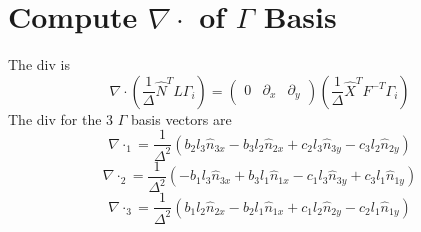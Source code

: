 \documentclass[a4paper,onecolumn]{article}
\begin{document}
\section{Compute $\nabla \cdot$ of $\Gamma$ Basis}
The div is
\begin{equation*}
    \nabla \cdot (\frac{1}{\Delta} \hat{N}^T L \Gamma_i) 
    = \begin{pmatrix}
         0 &\partial_x &\partial_y
     \end{pmatrix} (\frac{1}{\Delta} \hat{X}^T F^{-T} \Gamma_i)
\end{equation*}
The div for the 3 $\Gamma$ basis vectors are
$$
    \nabla \cdot _1 = \frac{1}{\Delta^2} (b_2 l_3 \hat{n}_{3x}
                                        - b_3 l_2 \hat{n}_{2x}
                                        + c_2 l_3 \hat{n}_{3y}
                                        - c_3 l_2 \hat{n}_{2y} )
$$
$$
    \nabla \cdot _2 = \frac{1}{\Delta^2} (-b_1 l_3 \hat{n}_{3x}
                                        + b_3 l_1 \hat{n}_{1x}
                                        - c_1 l_3 \hat{n}_{3y}
                                        + c_3 l_1 \hat{n}_{1y} )
$$
$$
    \nabla \cdot _3 = \frac{1}{\Delta^2} (b_1 l_2 \hat{n}_{2x}
                                        - b_2 l_1 \hat{n}_{1x}
                                        + c_1 l_2 \hat{n}_{2y}
                                        - c_2 l_1 \hat{n}_{1y} )
$$
\end{document}
